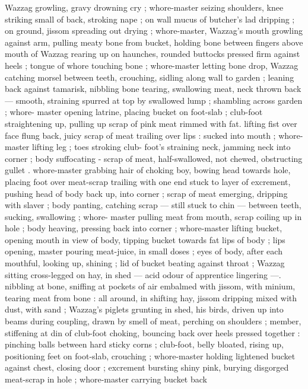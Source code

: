 Wazzag growling, gravy drowning cry ; whore-master seizing 
shoulders, knee striking small of back, stroking nape ; on wall 
mucus of butcher's lad dripping ; on ground, jissom spreading out 
drying ; whore-master, Wazzag's mouth growling against arm, pulling 
meaty bone from bucket, holding bone between fingers above mouth 
of Wazzag rearing up on haunches, rounded buttocks pressed firm 
against heels ; tongue of whore touching bone ; whore-master letting 
bone drop, Wazzag catching morsel between teeth, crouching, sidling 
along wall to garden ; leaning back against tamarisk, nibbling bone 
tearing, swallowing meat, neck thrown back --- smooth, straining 
spurred at top by swallowed lump ; shambling across garden ; whore- 
master opening latrine, placing bucket on foot-slab ; club-foot 
straightening up, pulling up scrap of pink meat rimmed with fat. 
lifting fist over face flung back, juicy scrap of meat trailing over lips 
: sucked into mouth ; whore-master lifting leg ; toes stroking club- 
foot's straining neck, jamming neck into corner ; body suffocating - 
scrap of meat, half-swallowed, not chewed, obstructing gullet . 
whore-master grabbing hair of choking boy, bowing head towards 
hole, placing foot over meat-scrap trailing with one end stuck to layer 
of excrement, pushing head of body back up, into corner ; scrap of 
meat emerging, dripping with slaver ; body panting, catching scrap 
--- still stuck to chin --- between teeth, sucking, swallowing ; whore- 
master pulling meat from mouth, scrap coiling up in hole ; body 
heaving, pressing back into corner ; whore-master lifting bucket, 
opening mouth in view of body, tipping bucket towards fat lips of 
body ; lips opening, master pouring meat-juice, in small doses ; eyes 
of body, after each mouthful, looking up, shining ; lid of bucket 
beating against throat ; Wazzag sitting cross-legged on hay, in shed 
--- acid odour of apprentice lingering ---. nibbling at bone, sniffing 
at pockets of air embalmed with jissom, with minium, tearing meat 
from bone : all around, in shifting hay, jissom dripping mixed with 
dust, with sand ; Wazzag's piglets grunting in shed, his birds, driven 
up into beams during coupling, drawn by smell of meat, perching on 
shoulders ; member, stiffening at din of club-foot choking, bouncing 
back over heels pressed together : pinching balls between hard 
sticky corns ; club-foot, belly bloated, rising up, positioning feet on 
foot-slab, crouching ; whore-master holding lightened bucket against 
chest, closing door ; excrement bursting shiny pink, burying 
disgorged meat-scrap in hole ; whore-master carrying bucket back 
